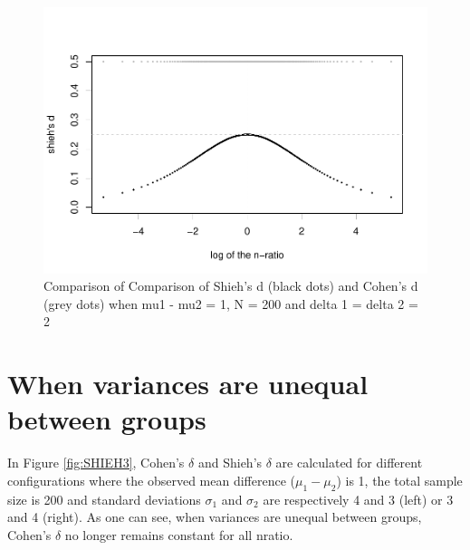 \documentclass[man,floatsintext]{apa6}
\begin{document}
\begin{figure}
\centering
\includegraphics{The-shieh-s-and-its-relation-with-Cohen-s-d_files/figure-latex/SHIEH2-1.pdf}
\caption{\label{fig:SHIEH2}Comparison of Comparison of Shieh's d (black dots) and Cohen's d (grey dots) when mu1 - mu2 = 1, N = 200 and delta 1 = delta 2 = 2}
\end{figure}

\hypertarget{when-variances-are-unequal-between-groups}{%
\section{When variances are unequal between groups}\label{when-variances-are-unequal-between-groups}}

In Figure \ref{fig:SHIEH3}, Cohen's \(\delta\) and Shieh's \(\delta\) are calculated for different configurations where the observed mean difference (\(\mu_{1}-\mu_{2}\)) is 1, the total sample size is 200 and standard deviations \(\sigma_{1}\) and \(\sigma_{2}\) are respectively 4 and 3 (left) or 3 and 4 (right). As one can see, when variances are unequal between groups, Cohen's \(\delta\) no longer remains constant for all nratio.
\end{document}
